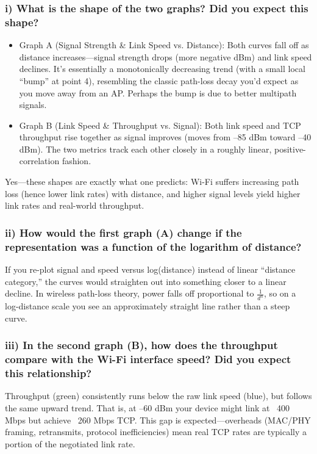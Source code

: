 \documentclass{article}
\begin{document}
\subsubsection{i) What is the shape of the two graphs? Did you expect this shape?}
\begin{itemize}
    \item Graph A (Signal Strength \& Link Speed vs. Distance): Both curves fall off as distance increases—signal strength drops (more negative dBm) and link speed declines. It’s essentially a monotonically decreasing trend (with a small local “bump” at point 4), resembling the classic path-loss decay you’d expect as you move away from an AP. Perhaps the bump is due to better multipath signals.
    \item Graph B (Link Speed \& Throughput vs. Signal): Both link speed and TCP throughput rise together as signal improves (moves from –85 dBm toward –40 dBm). The two metrics track each other closely in a roughly linear, positive-correlation fashion.
\end{itemize}


Yes—these shapes are exactly what one predicts: Wi-Fi suffers increasing path loss (hence lower link rates) with distance, and higher signal levels yield higher link rates and real-world throughput.
\subsubsection{ii) How would the first graph (A) change if the representation was a function of the logarithm of distance?}
If you re-plot signal and speed versus log(distance) instead of linear “distance category,” the curves would straighten out into something closer to a linear decline. In wireless path-loss theory, power falls off proportional to $\frac{1}{d^n}$, so on a log-distance scale you see an approximately straight line rather than a steep curve.
\subsubsection{iii) In the second graph (B), how does the throughput compare with the Wi-Fi interface speed? Did you expect this relationship?}
Throughput (green) consistently runs below the raw link speed (blue), but follows the same upward trend. That is, at –60 dBm your device might link at ~400 Mbps but achieve ~260 Mbps TCP. This gap is expected—overheads (MAC/PHY framing, retransmits, protocol inefficiencies) mean real TCP rates are typically a portion of the negotiated link rate.
\end{document}
